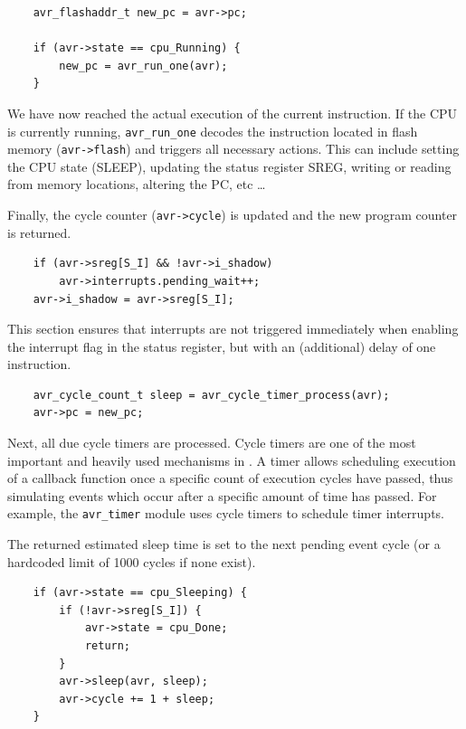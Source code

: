 \begin{lstlisting}
    avr_flashaddr_t new_pc = avr->pc;

    if (avr->state == cpu_Running) {
        new_pc = avr_run_one(avr);
    }
\end{lstlisting}

We have now reached the actual execution of the current instruction. If the \ac{CPU}
is currently running, \lstinline|avr_run_one| decodes the instruction located in flash memory
(\lstinline|avr->flash|) and triggers all necessary actions. This can include setting the \ac{CPU}
state (SLEEP), updating the status register \ac{SREG}, writing or reading from memory
locations, altering the \ac{PC}, etc \ldots

Finally, the cycle counter (\lstinline|avr->cycle|) is updated and the new
program counter is returned.

\begin{lstlisting}
    if (avr->sreg[S_I] && !avr->i_shadow)
        avr->interrupts.pending_wait++;
    avr->i_shadow = avr->sreg[S_I];
\end{lstlisting}

This section ensures that interrupts are not triggered immediately when
enabling the interrupt flag in the status register, but with an (additional)
delay of one instruction.

\begin{lstlisting}
    avr_cycle_count_t sleep = avr_cycle_timer_process(avr);
    avr->pc = new_pc;
\end{lstlisting}

Next, all due cycle timers are processed. Cycle timers are one of the
most important and heavily used mechanisms in \simavr. A timer allows scheduling
execution of a callback function once a specific count of execution cycles have
passed, thus simulating events which occur after a specific amount of time has
passed. For example, the \lstinline|avr_timer| module uses cycle timers to schedule timer
interrupts.

The returned estimated sleep time is set to the next pending event cycle (or a
hardcoded limit of 1000 cycles if none exist).

\begin{lstlisting}
    if (avr->state == cpu_Sleeping) {
        if (!avr->sreg[S_I]) {
            avr->state = cpu_Done;
            return;
        }
        avr->sleep(avr, sleep);
        avr->cycle += 1 + sleep;
    }
\end{lstlisting}

